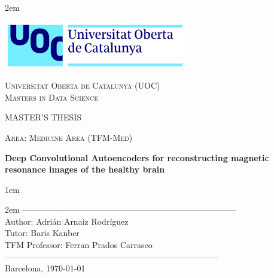 \newpage
\thispagestyle{empty}

\baselineskip 2em


\centerline{\includegraphics[width=0.6\textwidth]{images/UOC-logo}}
\begin{center}
\textsc{Universitat Oberta de Catalunya (UOC) \\
 Masters in Data Science\\}


\vspace*{1.5cm}

\textsc{\Large MASTER'S THESIS}

\vspace*{0.5cm}

\textsc{\large Area: Medicine Area (TFM-Med)}



\vspace*{2.0cm}

\textbf{\Large Deep Convolutional Autoencoders for reconstructing magnetic resonance images of the healthy brain}

\vspace{2.5cm}
\baselineskip 1em

\baselineskip 2em
-----------------------------------------------------------------------------\\
Author:     Adrián Arnaiz Rodríguez\\
Tutor:      Baris Kanber\\
TFM Professor: Ferran Prados Carrasco\\
-----------------------------------------------------------------------------\\
\vspace*{1.5cm}
Barcelona, \today

\end{center}

\newpage
\pagestyle{empty}
\hfill
